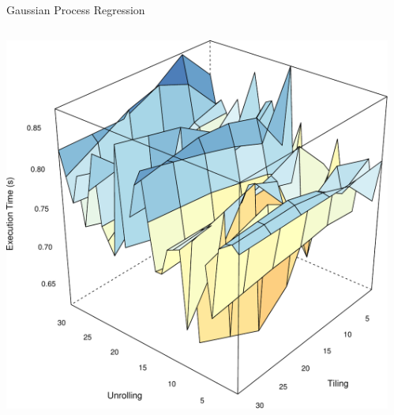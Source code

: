 \documentclass[10pt, compress, aspectratio=169, xcolor={table,usenames,dvipsnames}]{beamer}
\begin{document}
\begin{frame}[label={sec:orgb8a1473}]{Gaussian Process Regression}
\begin{columns}
\begin{column}{0.5\columnwidth}
\begin{center}
\includegraphics[width=.95\columnwidth]{../../../img/bicgkernel_averaged_search_space.pdf}
\end{center}

\end{column}
\begin{column}{0.5\columnwidth}
\end{column}
\end{columns}
\end{frame}
\end{document}
